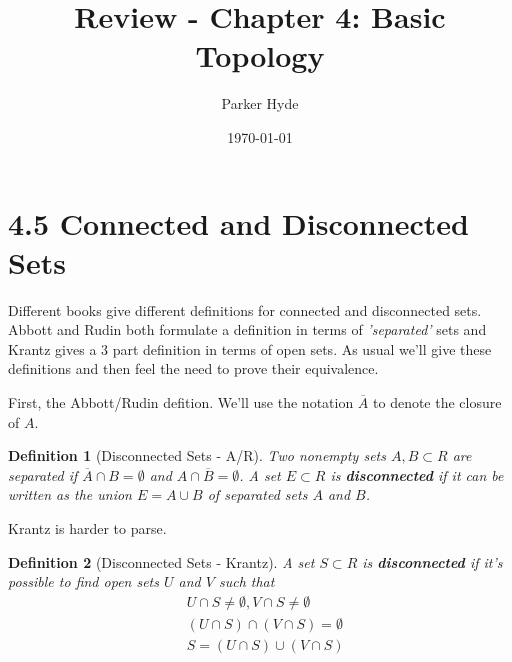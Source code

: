 \documentclass{article}
\begin{document}
\title{Review - Chapter 4: Basic Topology}
\author{Parker Hyde}
\date{\today}
\maketitle

\newtheorem{theorem}{Theorem}
\newtheorem{definition}{Definition}
\newtheorem{exmp}{Example}
\newtheorem{proposition}{Proposition}
\newtheorem{lemma}{Lemma}
\newtheorem{corollary}{Corollary}
\newtheorem{remark}{Remark}

\section*{4.5 Connected and Disconnected Sets}

Different books give different definitions for connected and disconnected sets.
Abbott and Rudin both formulate a definition in terms of \textit{'separated'}
sets and Krantz gives a 3 part definition in terms of open sets.
As usual we'll give these definitions and then feel the need to prove their
equivalence.
\smallbreak

First, the Abbott/Rudin defition. We'll use the notation \( \overline{A} \) to denote
the closure of \( A \). 

\begin{definition}[Disconnected Sets - A/R]
    Two nonempty sets \( A,B \subset R \) are separated if \( \overline{A} \cap B = \emptyset \) 
    and \( A \cap \overline{B} = \emptyset \). A set \( E \subset R \) is \textbf{disconnected} if 
    it can be written as the union \( E = A \cup B \) of separated sets \( A \) and \( B \).
\end{definition}

Krantz is harder to parse.

\begin{definition}[Disconnected Sets - Krantz]
    A set \( S \subset R \) is \textbf{disconnected} if it's possible to find open sets
    \( U \) and \( V \) such that 
    \begin{align}
        &U \cap S \ne \emptyset, V \cap S \ne \emptyset \\
        &(U \cap S) \cap (V \cap S) = \emptyset \\
        &S = (U \cap S)  \cup (V \cap S)
    \end{align}
\end{definition}
\end{document}
